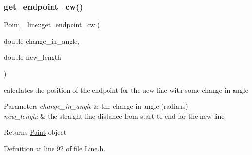 \begin{DoxyCode}{0}

\end{DoxyCode}
\mbox{\label{struct__line_ac8b12b24b4b86bd4d8c09476d5b7efed}} 
\subsubsection{\texorpdfstring{get\_endpoint\_cw()}{get\_endpoint\_cw()}}
{\footnotesize\ttfamily \mbox{\hyperlink{struct_point}{Point}} \+\_\+line\+::get\+\_\+endpoint\+\_\+cw (\begin{DoxyParamCaption}\item[{double}]{change\+\_\+in\+\_\+angle,  }\item[{double}]{new\+\_\+length }\end{DoxyParamCaption})\hspace{0.3cm}{\ttfamily [inline]}}



calculates the position of the endpoint for the new line with some change in angle 


\begin{DoxyParams}{Parameters}
{\em change\+\_\+in\+\_\+angle} & the change in angle (radians) \\
\hline
{\em new\+\_\+length} & the straight line distance from start to end for the new line \\
\hline
\end{DoxyParams}
\begin{DoxyReturn}{Returns}
\mbox{\hyperlink{struct_point}{Point}} object 
\end{DoxyReturn}


Definition at line 92 of file Line.\+h.


